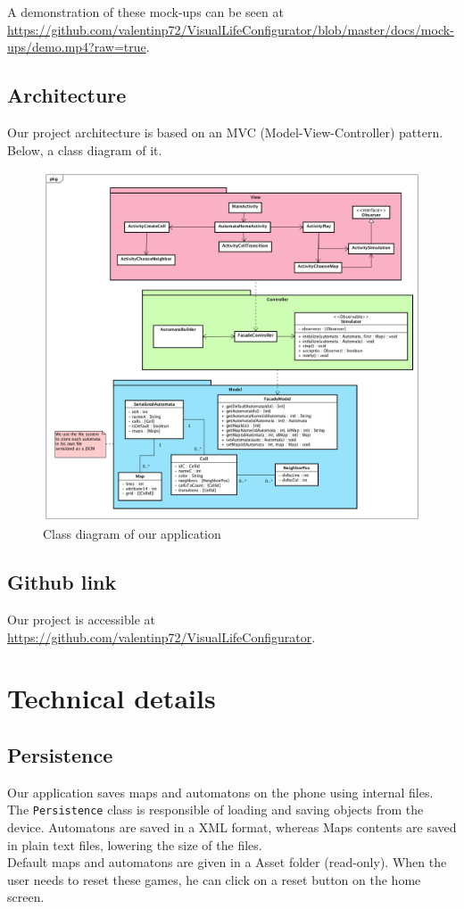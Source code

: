 \documentclass{report}
\begin{document}
\vspace{12pt}
A demonstration of these mock-ups can be seen at \url{https://github.com/valentinp72/VisualLifeConfigurator/blob/master/docs/mock-ups/demo.mp4?raw=true}.


\newpage
\section{Architecture}

Our project architecture is based on an MVC (Model-View-Controller) pattern. Below, a class diagram of it.

\begin{figure}[H]
	\centering
	\includegraphics[width=\linewidth]{../class_diagram.png}
	\caption{Class diagram of our application}
\end{figure}

\section{Github link}
Our project is accessible at \url{https://github.com/valentinp72/VisualLifeConfigurator}.


\chapter{Technical details}

\section{Persistence}
\par Our application saves maps and automatons on the phone using internal files. The \texttt{Persistence} class is responsible of loading and saving objects from the device. Automatons are saved in a XML format, whereas Maps contents are saved in plain text files, lowering the size of the files. \\
Default maps and automatons are given in a Asset folder (read-only). When the user needs to reset these games, he can click on a reset button on the home screen.
\end{document}

